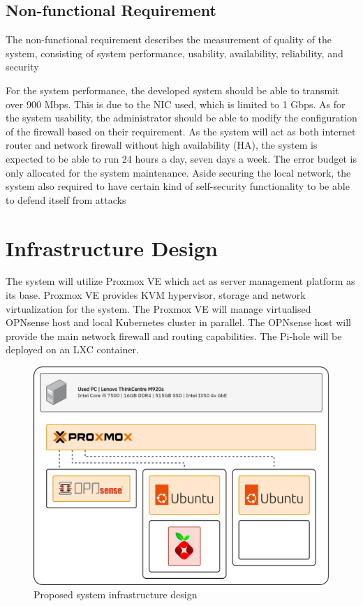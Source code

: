 \documentclass[../index.tex]{subfiles}
\begin{document}
\subsection{Non-functional Requirement}

The non-functional requirement describes the measurement of quality of the system, consisting of
system performance, usability, availability, reliability, and security

For the system performance, the developed system should be able to transmit over 900 Mbps. This is
due to the NIC used, which is limited to 1 Gbps. As for the system usability, the administrator
should be able to modify the configuration of the firewall based on their requirement. As the system
will act as both internet router and network firewall without high availability (HA), the system is
expected to be able to run 24 hours a day, seven days a week. The error budget is only allocated for
the system maintenance. Aside securing the local network, the system also required to have certain
kind of self-security functionality to be able to defend itself from attacks

\section{Infrastructure Design}

The system will utilize Proxmox VE which act as server management platform as its base. Proxmox VE
provides KVM hypervisor, storage and network virtualization for the system. The Proxmox VE will
manage virtualised OPNsense host and local Kubernetes cluster in parallel. The OPNsense host will
provide the main network firewall and routing capabilities. The Pi-hole will be deployed on an LXC
container.

\begin{figure}[h]
  \includegraphics[width=\textwidth]{../assets/project_design.drawio.png}
  \caption{Proposed system infrastructure design}
  \label{fig:project_design}
\end{figure}
\end{document}
